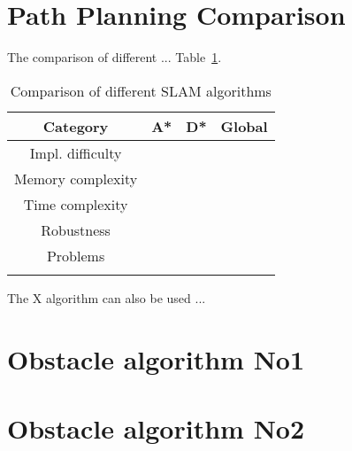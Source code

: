 \documentclass[12pt, a4paper, onecolumn]{article}
\begin{document}
\section{Path Planning Comparison}
The comparison of different ...
Table~\ref{tab:path_algorithms}.
\begin{table}[h!]
  \begin{center}
    \begin{tabular}[c]{|c || c c c |}
      \hline
       Category        &  A*            & D*            & Global     \\
      \hline
      Impl. difficulty &         &  &      \\
      \hline
      Memory complexity&          &           &      \\
      \hline
      Time complexity  &          &         &      \\
      \hline
      Robustness       &           &         &      \\
      \hline
      Problems         &  &  & \\
                       &  &  & \\
      \hline
    \end{tabular}
  \end{center}
  \caption{Comparison of different SLAM algorithms}
  \label{tab:path_algorithms}
\end{table}
The X algorithm can also be used ...

\section{Obstacle algorithm No1}

\section{Obstacle algorithm No2}

\end{document}
